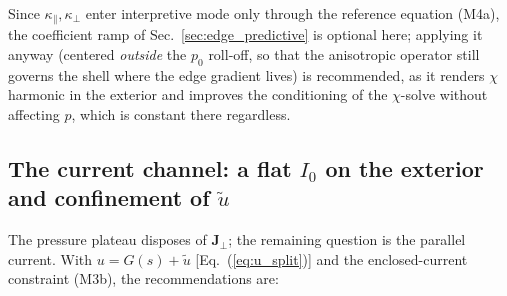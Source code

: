 \documentclass[english]{article}
\newcommand{\bJ}{\mathbf{J}}
\begin{document}
Since $\kappa_\parallel,\kappa_\perp$ enter interpretive mode only through the reference
equation (M4a), the coefficient ramp of Sec.~\ref{sec:edge_predictive} is optional here; applying
it anyway (centered \emph{outside} the $p_0$ roll-off, so that the anisotropic operator still
governs the shell where the edge gradient lives) is recommended, as it renders $\chi$ harmonic in
the exterior and improves the conditioning of the $\chi$-solve without affecting $p$, which is
constant there regardless.

\subsection{The current channel: a flat $I_0$ on the exterior and confinement of $\tilde u$}
\label{sec:edge_current}

The pressure plateau disposes of $\bJ_\perp$; the remaining question is the parallel current.
With $u=G(s)+\tilde u$ [Eq.~(\ref{eq:u_split})] and the enclosed-current constraint (M3b), the
recommendations are:
\end{document}
